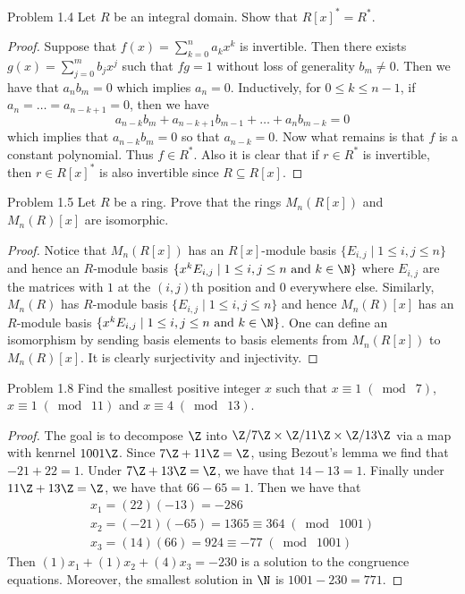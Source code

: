 \documentclass[a4paper]{article}
\begin{document}
\begin{ex}{Problem 1.4}{} Let $R$ be an integral domain. Show that $R[x]^\ast=R^\ast$. 
\begin{proof}
Suppose that $f(x)=\sum_{k=0}^na_kx^k$ is invertible. Then there exists $g(x)=\sum_{j=0}^mb_jx^j$ such that $fg=1$ without loss of generality $b_m\neq 0$. Then we have that $a_nb_m=0$ which implies $a_n=0$. Inductively, for $0\leq k\leq n-1$, if $a_n=\dots=a_{n-k+1}=0$, then we have $$a_{n-k}b_m+a_{n-k+1}b_{m-1}+\dots+a_nb_{m-k}=0$$ which implies that $a_{n-k}b_m=0$ so that $a_{n-k}=0$. Now what remains is that $f$ is a constant polynomial. Thus $f\in R^\ast$. Also it is clear that if $r\in R^\ast$ is invertible, then $r\in R[x]^\ast$ is also invertible since $R\subseteq R[x]$. 
\end{proof}
\end{ex}

\begin{ex}{Problem 1.5}{} Let $R$ be a ring. Prove that the rings $M_n(R[x])$ and $M_n(R)[x]$ are isomorphic. 
\begin{proof}
Notice that $M_n(R[x])$ has an $R[x]$-module basis $\{E_{i,j}\;|\;1\leq i,j\leq n\}$ and hence an $R$-module basis $\{x^kE_{i,j}\;|\;1\leq i,j\leq n\text{ and }k\in\N\}$ where $E_{i,j}$ are the matrices with $1$ at the $(i,j)$th position and $0$ everywhere else. Similarly, $M_n(R)$ has $R$-module basis $\{E_{i,j}\;|\;1\leq i,j\leq n\}$ and hence $M_n(R)[x]$ has an $R$-module basis $\{x^kE_{i,j}\;|\;1\leq i,j\leq n\text{ and }k\in\N\}$. One can define an isomorphism by sending basis elements to basis elements from $M_n(R[x])$ to $M_n(R)[x]$. It is clearly surjectivity and injectivity. 
\end{proof}
\end{ex}

\begin{ex}{Problem 1.8}{} Find the smallest positive integer $x$ such that $x\equiv 1\;(\bmod\;7)$, $x\equiv 1\;(\bmod\;11)$ and $x\equiv 4\;(\bmod\;13)$. 
\begin{proof}
The goal is to decompose $\Z$ into $\Z/7\Z\times\Z/11\Z\times\Z/13\Z$ via a map with kenrnel $1001\Z$. Since $7\Z+11\Z=\Z$, using Bezout's lemma we find that $-21+22=1$. Under $7\Z+13\Z=\Z$, we have that $14-13=1$. Finally under $11\Z+13\Z=\Z$, we have that $66-65=1$. Then we have that 
\begin{gather*}
x_1=(22)(-13)=-286\\
x_2=(-21)(-65)=1365\equiv 364\;(\bmod\;1001)\\
x_3=(14)(66)=924\equiv -77\;(\bmod\;1001)
\end{gather*}
Then $(1)x_1+(1)x_2+(4)x_3=-230$ is a solution to the congruence equations. Moreover, the smallest solution in $\N$ is $1001-230=771$. 
\end{proof}
\end{ex}
\end{document}
